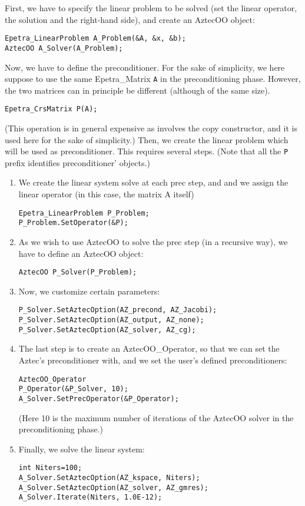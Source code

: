 First, we have to specify the linear problem to be solved (set the
linear operator, the solution and the right-hand side), and create an
AztecOO object:
\begin{verbatim}
Epetra_LinearProblem A_Problem(&A, &x, &b);
AztecOO A_Solver(A_Problem);
\end{verbatim}
Now, we have to define the preconditioner. For the sake of simplicity,
we here suppose to use the same Epetra\_Matrix \verb!A! in the
preconditioning phase. However, the two matrices can in principle be
different (although of the same size).
\begin{verbatim}
Epetra_CrsMatrix P(A);
\end{verbatim}
(This operation is in general expensive as involves the copy
constructor, and it is used here for the sake of simplicity.)  Then, we
create the linear problem which will be used as preconditioner.  This
requires several steps.  (Note that all the \verb!P! prefix identifies
preconditioner' objects.)
\begin{enumerate}
\item We create the linear system solve at each prec step, and and we
  assign the linear operator (in this case, the matrix A itself)
\begin{verbatim}
Epetra_LinearProblem P_Problem;
P_Problem.SetOperator(&P);
\end{verbatim}
\item As we wish to use AztecOO to solve the prec step (in a recursive
  way), we have to define an AztecOO object:
\begin{verbatim}
AztecOO P_Solver(P_Problem);  
\end{verbatim}
\item Now, we customize certain parameters:
\begin{verbatim}
P_Solver.SetAztecOption(AZ_precond, AZ_Jacobi);
P_Solver.SetAztecOption(AZ_output, AZ_none);
P_Solver.SetAztecOption(AZ_solver, AZ_cg);
\end{verbatim}
\item The last step is to create an AztecOO\_Operator, so that we can set
  the Aztec's preconditioner with, and we set the user's defined
  preconditioners:
\begin{verbatim}
AztecOO_Operator
P_Operator(&P_Solver, 10);  
A_Solver.SetPrecOperator(&P_Operator);
\end{verbatim}
(Here 10 is the maximum number of iterations of the AztecOO solver in
the preconditioning phase.)
\item Finally, we solve the linear system:
\begin{verbatim}
int Niters=100;
A_Solver.SetAztecOption(AZ_kspace, Niters);
A_Solver.SetAztecOption(AZ_solver, AZ_gmres);
A_Solver.Iterate(Niters, 1.0E-12);  
\end{verbatim}
\end{enumerate}


